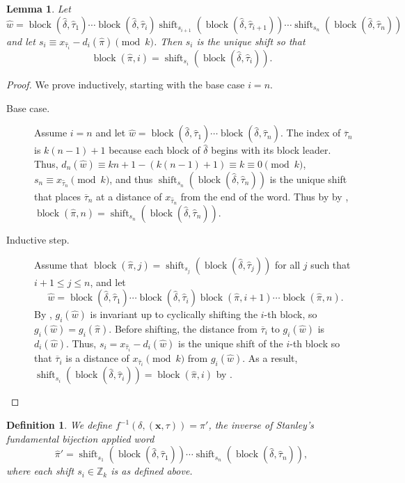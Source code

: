 \documentclass{article}
\numberwithin{theorem}{section}
\newtheorem{lemma}[theorem]{Lemma}
\newtheorem{definition}[theorem]{Definition}
\theoremstyle{definition}
\newcommand\pihat{\hat{\pi}}
\newcommand\taubar{\overline\tau}
\newcommand{\shift}{\operatorname{shift}}
\newcommand{\x}{\mathbf x}
\newcommand{\xtau}{(\x,\tau)}
\newcommand{\deltaxtau}{\left(\delta,\xtau\right)}
\newcommand{\shiftBlock}[1]{\shift_{s_{#1}}\!\!\left(\block(\hat\delta, \hat\tau_{#1})\right)}
\newcommand{\block}{\operatorname{block}}
\begin{document}
\begin{lemma}\label{lem:computing-shifts}
    Let \[
        \hat w = \block(\hat\delta, \hat\tau_1)\cdots
        \block(\hat\delta, \hat\tau_i)
        \shiftBlock{i+1}
        \cdots
        \shiftBlock{n}
    \]
    and let $s_i \equiv x_{\hat\tau_i} -d_i(\hat\pi) \pmod k$. Then $s_i$ is the unique shift so that
    \[
        \block(\pihat,i) = \shift_{s_i}(\block(\hat\delta,\hat\tau_i)).
    \]
\end{lemma}
\begin{proof}
We prove inductively, starting with the base case $i = n$.
\begin{description}
    \item[Base case.]
    Assume $i = n$ and let \(\hat w = \block(\hat\delta,\hat\tau_1)\cdots\block(\hat\delta,\hat\tau_n)\). The index of $\overline{\tau}_n$ is $k(n-1) +1$ because each block of $\hat\delta$ begins with its block leader. Thus, $d_n(\hat w) \equiv kn+1-(k(n-1)+1) \equiv k\equiv 0 \pmod k$, $s_n \equiv x_{\hat\tau_n}\pmod k$, and thus $\shift_{s_n}\!\!\left(\block(\hat\delta,\hat\tau_n)\right)$ is the unique shift that places $\overline\tau_n$ at a distance of $x_{\hat\tau_n}$ from the end of the word. Thus by by , $\block(\pihat,n) = \shift_{s_n}(\block(\hat\delta,\hat\tau_n))$.

    \item[Inductive step.]
    Assume that $\block(\pihat,j) = \shiftBlock{j}$ for all $j$ such that $i + 1 \le j \leq n$, and let \[
        \hat w = \block(\hat\delta,\hat\tau_1)\cdots\block(\hat\delta,\hat\tau_i)\block(\pihat,i+1) \cdots \block(\pihat, n).
    \] By , $g_i(\hat w)$ is invariant up to cyclically shifting the $i$-th block, so $g_i(\hat w) = g_i(\pihat)$. Before shifting, the distance from $\overline{\tau}_i$ to $g_i(\hat w)$ is $d_i(\hat w)$. Thus, $s_i = x_{\hat\tau_i}-d_i(\hat w)$ is the unique shift of the $i$-th block so that $\taubar_i$ is a distance of $x_{\hat\tau_i} \pmod k$ from $g_i(\hat w)$. As a result, $\shiftBlock{i} = \block(\pihat,i)$ by .
\end{description}
\end{proof}

\begin{definition}
    We define $f^{-1}\!\deltaxtau = \pi'$, the inverse of Stanley's fundamental bijection applied word
    \[
        \hat\pi' = \shift_{s_1}(\block(\hat \delta,\hat\tau_1))
        \cdots
        \shift_{s_n}(\block(\hat \delta,\hat\tau_n)),
    \]
    where each shift $s_i\in\mathbb{Z}_k$ is as defined above.
\end{definition}
\end{document}
